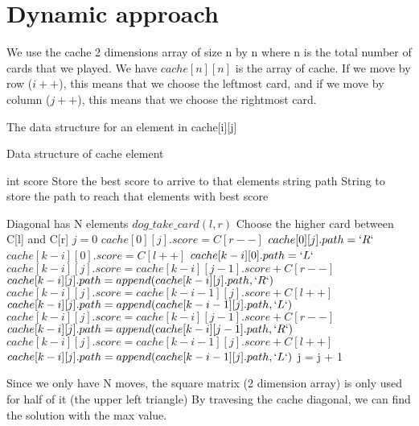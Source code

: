 \documentclass{article}
\begin{document}
\section{Dynamic approach}

We use the cache 2 dimensions array of size n by n where n is the total number of cards that we played. We have $cache[n][n]$ is the array of cache. If we move by row ($i++$), this means that we choose the leftmost card, and if we move by column ($j++$), this means that we choose the rightmost card.

The data structure for an element in cache[i][j]
\begin{algorithm}[H]
\begin{algorithmic}
\caption{Data structure of cache element}
\State int score \Comment Store the best score to arrive to that elements
\State string path \Comment String to store the path to reach that elements with best score
\end{algorithmic}
\end{algorithm}
\begin{algorithm}[H]
\begin{algorithmic}
\caption{}
 \Comment Diagonal has N elements
	\State $dog\_take\_card(l,r)$ \Comment Choose the higher card between C[l] and C[r]
	\State $j = 0$
			\State $cache[0][j].score = C[r--]$
			\State $cache[0][j].path = `R`$
			\State $cache[k-i][0].score = C[l++]$ 
			\State $cache[k-i][0].path = `L`$
		\Else 
			   	\State $cache[k-i][j].score = cache[k-i][j-1].score + C[r--]$
				\State $cache[k-i][j].path = append(cache[k-i][j].path,`R`)$
			    \State $cache[k-i][j].score = cache[k-i-1][j].score + C[l++]$
				\State $cache[k-i][j].path = append(cache[k-i-1][j].path,`L`)$
				\State $cache[k-i][j].score = cache[k-i][j-1].score + C[r--]$
				\State $cache[k-i][j].path = append(cache[k-i][j-1].path,`R`)$
			\Else 
				\State $cache[k-i][j].score = cache[k-i-1][j].score + C[l++]$
				\State $cache[k-i][j].path = append(cache[k-i-1][j].path,`L`)$	
			\EndIf 
		\EndIf
		\State j = j + 1
	\EndFor
\EndFor
\EndProcedure
\end{algorithmic}
\end{algorithm}

Since we only have N moves, the square matrix (2 dimension array) is only used for half of it (the upper left triangle)
By travesing the cache diagonal, we can find the solution with the max value.
\end{document}
